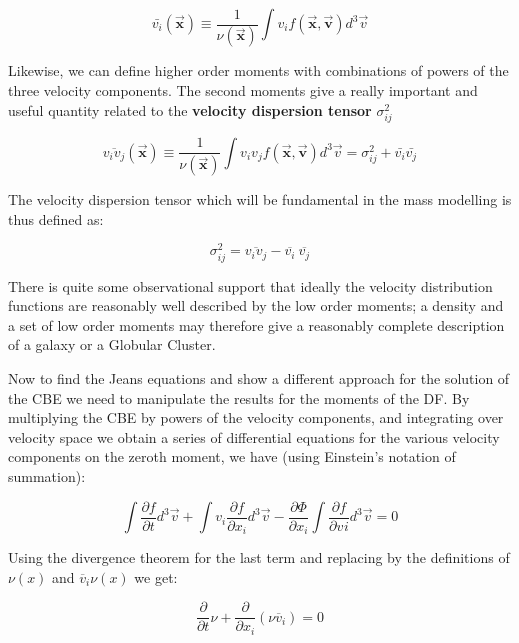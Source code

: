 \begin{equation}
\bar{v_{i}}(\vec{\textbf{x}})\equiv \frac{1}{\nu(\vec{\textbf{x}})}\int v_{i}f(\vec{\textbf{x}},\vec{\textbf{v}})d^{3}\vec{v}
\end{equation}

Likewise, we can define higher order moments with combinations of powers of the three velocity components. The second moments give a really important and useful quantity related to the \textbf{velocity dispersion tensor} $\sigma^{2}_{ij}$

\begin{equation}
\overline{v_{i}v_{j}}(\vec{\textbf{x}})\equiv \frac{1}{\nu(\vec{\textbf{x}})}\int v_{i}v_{j}f(\vec{\textbf{x}},\vec{\textbf{v}})d^{3}\vec{v}=\sigma^{2}
_{ij}+\bar{v_{i}}\bar{v_{j}}
\end{equation}

The velocity dispersion tensor which will be fundamental in the mass modelling is thus defined as:

\begin{equation}
\sigma_{ij}^{2}=\overline{v_{i}v_{j}}-\overline{v_{i}}\:\overline{v_{j}}
\end{equation}

There is quite some observational support that ideally the velocity distribution functions are reasonably well described by the low order moments; a density and a set of low order moments may therefore give a reasonably complete description of a galaxy or a Globular Cluster. 

Now to find the Jeans equations and show a different approach for the solution of the CBE we need to manipulate the results for the moments of the DF. By multiplying the CBE by powers of the velocity components, and integrating over velocity space we obtain a series of differential equations for the various velocity components on the zeroth moment, we have (using Einstein's notation of summation):

\begin{equation}
\int \frac{\partial f}{\partial t}d^{3}\vec{v}+ \int v_{i}\frac{\partial f}{\partial x_{i}} d^{3}\vec{v}- \frac{\partial\Phi}{\partial x_{i}}\int \frac{\partial f}{\partial v_{}i} d^{3}\vec{v}= 0
\end{equation}

Using the divergence theorem for the last term and replacing by the definitions of $\nu(x)$ and $\overline{v}_{i}\nu(x)$ we get:

\begin{equation}
\frac{\partial}{\partial t}\nu+\frac{\partial}{\partial x_{i}}(\nu \overline{v}_{i})=0
\end{equation}

